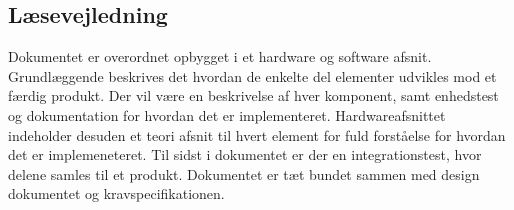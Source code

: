 \subsection{Læsevejledning}
Dokumentet er overordnet opbygget i et hardware og software afsnit. Grundlæggende beskrives det hvordan de enkelte del elementer udvikles mod et færdig produkt. Der vil være en beskrivelse af hver komponent, samt enhedstest og dokumentation for hvordan det er implementeret. Hardwareafsnittet indeholder desuden et teori afsnit til hvert element for fuld forståelse for hvordan det er implemeneteret. Til sidst i dokumentet er der en integrationstest, hvor delene samles til et produkt. Dokumentet er tæt bundet sammen med design dokumentet og kravspecifikationen.